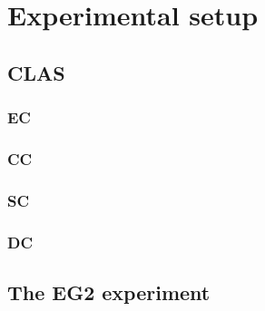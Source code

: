 \chapter{Experimental setup}

\section{CLAS}

\subsection{EC}

\subsection{CC}

\subsection{SC}

\subsection{DC}

\section{The EG2 experiment}

